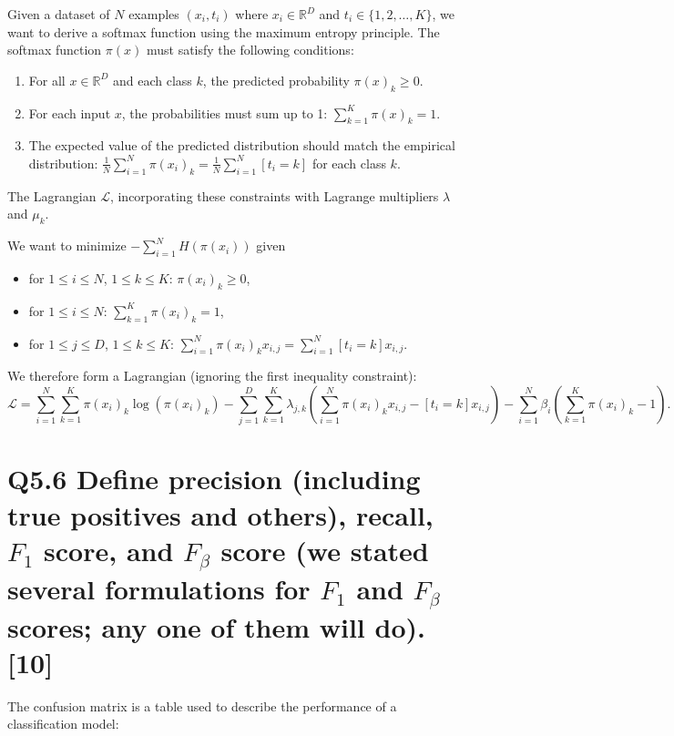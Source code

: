 \documentclass[11pt]{article}
\begin{document}
Given a dataset of $N$ examples $(x_i, t_i)$ where $x_i \in \mathbb{R}^D$ and $t_i \in \{1, 2, \ldots, K\}$, we want to derive a softmax function using the maximum entropy principle. The softmax function $\pi(x)$ must satisfy the following conditions:

\begin{enumerate}
    \item For all $x \in \mathbb{R}^D$ and each class $k$, the predicted probability $\pi(x)_k \geq 0$.
    \item For each input $x$, the probabilities must sum up to 1: $\sum_{k=1}^K \pi(x)_k = 1$.
    \item The expected value of the predicted distribution should match the empirical distribution: $\frac{1}{N} \sum_{i=1}^N \pi(x_i)_k = \frac{1}{N} \sum_{i=1}^N [t_i = k]$ for each class $k$.
\end{enumerate}

The Lagrangian $\mathcal{L}$, incorporating these constraints with Lagrange multipliers $\lambda$ and $\mu_k$.

We want to minimize $-\sum_{i=1}^{N} H(\pi(x_i))$ given
\begin{itemize}
    \item for $1 \leq i \leq N$, $1 \leq k \leq K$: $\pi(x_i)_k \geq 0$,
    \item for $1 \leq i \leq N$: $\sum_{k=1}^{K} \pi(x_i)_k = 1$,
    \item for $1 \leq j \leq D$, $1 \leq k \leq K$: $\sum_{i=1}^{N} \pi(x_i)_k x_{i,j} = \sum_{i=1}^{N} [t_i = k] x_{i,j}$.
\end{itemize}

We therefore form a Lagrangian (ignoring the first inequality constraint):
\[
\mathcal{L} = \sum_{i=1}^{N} \sum_{k=1}^{K} \pi(x_i)_k \log(\pi(x_i)_k) 
- \sum_{j=1}^{D} \sum_{k=1}^{K} \lambda_{j,k} \left( \sum_{i=1}^{N} \pi(x_i)_k x_{i,j} - [t_i = k] x_{i,j} \right) 
- \sum_{i=1}^{N} \beta_i \left( \sum_{k=1}^{K} \pi(x_i)_k - 1 \right).
\]


\section{Q5.6 Define precision (including true positives and others), recall, $F_1$ score, and $F_\beta$ score (we stated several formulations for $F_1$ and $F_\beta$ scores; any one of them will do). [10]}

The confusion matrix is a table used to describe the performance of a classification model:
\end{document}
